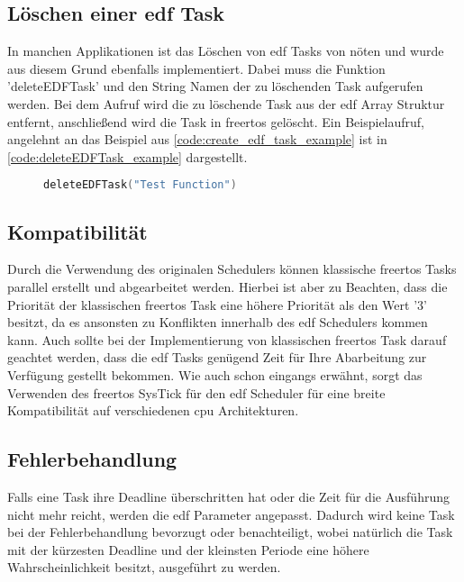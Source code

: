\documentclass[../EDF Master Thesis.tex]{subfiles}
\begin{document}
\subsection{Löschen einer \ac{edf} Task} \label{section:löschen_einer_edf_task}

    In manchen Applikationen ist das Löschen von \ac{edf} Tasks von nöten und wurde aus diesem Grund ebenfalls implementiert.
    Dabei muss die Funktion 'deleteEDFTask' und den String Namen der zu löschenden Task aufgerufen werden.
    Bei dem Aufruf wird die zu löschende Task aus der \ac{edf} Array Struktur entfernt, anschließend wird die Task in \ac{freertos} gelöscht.
    Ein Beispielaufruf, angelehnt an das Beispiel aus \autoref{code:create_edf_task_example} ist in \autoref{code:deleteEDFTask_example} dargestellt.

\begin{figure}[ht!]
\begin{lstlisting}[language=C, caption=deleteEDFTask Beispiel, label=code:deleteEDFTask_example]
    deleteEDFTask("Test Function")
\end{lstlisting}
\end{figure}

\subsection{Kompatibilität}

    Durch die Verwendung des originalen Schedulers können klassische \ac{freertos} Tasks parallel erstellt und abgearbeitet werden.
    Hierbei ist aber zu Beachten, dass die Priorität der klassischen \ac{freertos} Task eine höhere Priorität als den Wert '3' besitzt, da es ansonsten zu Konflikten innerhalb des \ac{edf} Schedulers kommen kann.
    Auch sollte bei der Implementierung von klassischen \ac{freertos} Task darauf geachtet werden, dass die \ac{edf} Tasks genügend Zeit für Ihre Abarbeitung zur Verfügung gestellt bekommen.
    Wie auch schon eingangs erwähnt, sorgt das Verwenden des \ac{freertos} SysTick für den \ac{edf} Scheduler für eine breite Kompatibilität auf verschiedenen \ac{cpu} Architekturen.

\subsection{Fehlerbehandlung} \label{section:Fehlerbehandlung}

    Falls eine Task ihre Deadline überschritten hat oder die Zeit für die Ausführung nicht mehr reicht, werden die \ac{edf} Parameter angepasst.
    Dadurch wird keine Task bei der Fehlerbehandlung bevorzugt oder benachteiligt, wobei natürlich die Task mit der kürzesten Deadline und der kleinsten Periode eine höhere Wahrscheinlichkeit besitzt, ausgeführt zu werden. 
\end{document}
